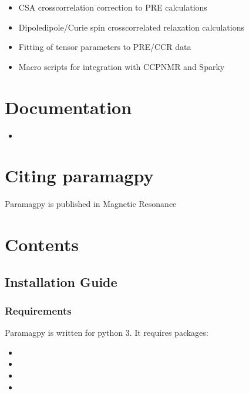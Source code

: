 \documentclass[a4paper,10pt,english,openany,oneside]{sphinxmanual}
\begin{document}
\begin{itemize}
\item {} 
\sphinxAtStartPar
CSA cross\sphinxhyphen{}correlation correction to PRE calculations

\item {} 
\sphinxAtStartPar
Dipole\sphinxhyphen{}dipole/Curie spin cross\sphinxhyphen{}correlated relaxation calculations

\item {} 
\sphinxAtStartPar
Fitting of tensor parameters to PRE/CCR data

\item {} 
\sphinxAtStartPar
Macro scripts for integration with CCPNMR and Sparky

\end{itemize}


\chapter{Documentation}
\label{\detokenize{index:documentation}}\begin{itemize}
\item {} 
\sphinxAtStartPar
{}

\end{itemize}


\chapter{Citing paramagpy}
\label{\detokenize{index:citing-paramagpy}}
\sphinxAtStartPar
Paramagpy is published in Magnetic Resonance 


\chapter{Contents}
\label{\detokenize{index:contents}}

\section{Installation Guide}
\label{\detokenize{install:installation-guide}}\label{\detokenize{install::doc}}

\subsection{Requirements}
\label{\detokenize{install:requirements}}
\sphinxAtStartPar
Paramagpy is written for python 3. It requires packages:
\begin{itemize}
\item {} 
\sphinxAtStartPar
{}

\item {} 
\sphinxAtStartPar
{}

\item {} 
\sphinxAtStartPar
{}

\item {} 
\sphinxAtStartPar
{}

\end{itemize}
\end{document}
